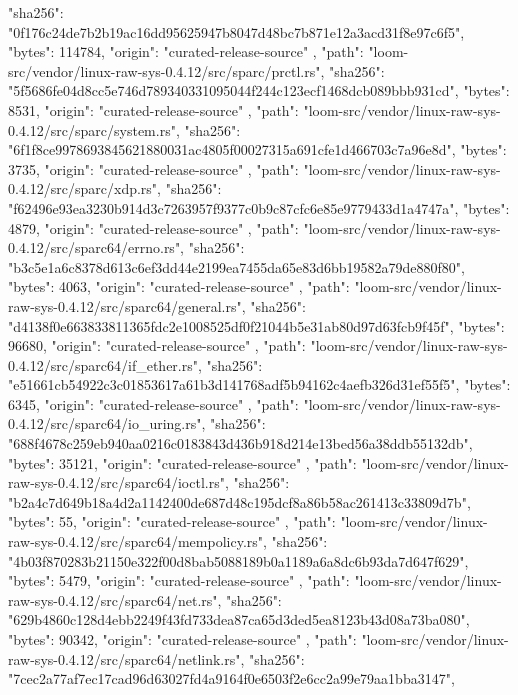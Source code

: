 {{      "sha256": "0f176c24de7b2b19ac16dd95625947b8047d48bc7b871e12a3acd31f8e97c6f5",
      "bytes": 114784,
      "origin": "curated-release-source"
    },
    {
      "path": "loom-src/vendor/linux-raw-sys-0.4.12/src/sparc/prctl.rs",
      "sha256": "5f5686fe04d8cc5e746d789340331095044f244c123ecf1468dcb089bbb931cd",
      "bytes": 8531,
      "origin": "curated-release-source"
    },
    {
      "path": "loom-src/vendor/linux-raw-sys-0.4.12/src/sparc/system.rs",
      "sha256": "6f1f8ce9978693845621880031ac4805f00027315a691cfe1d466703c7a96e8d",
      "bytes": 3735,
      "origin": "curated-release-source"
    },
    {
      "path": "loom-src/vendor/linux-raw-sys-0.4.12/src/sparc/xdp.rs",
      "sha256": "f62496e93ea3230b914d3c7263957f9377c0b9c87cfc6e85e9779433d1a4747a",
      "bytes": 4879,
      "origin": "curated-release-source"
    },
    {
      "path": "loom-src/vendor/linux-raw-sys-0.4.12/src/sparc64/errno.rs",
      "sha256": "b3c5e1a6c8378d613c6ef3dd44e2199ea7455da65e83d6bb19582a79de880f80",
      "bytes": 4063,
      "origin": "curated-release-source"
    },
    {
      "path": "loom-src/vendor/linux-raw-sys-0.4.12/src/sparc64/general.rs",
      "sha256": "d4138f0e663833811365fdc2e1008525df0f21044b5e31ab80d97d63fcb9f45f",
      "bytes": 96680,
      "origin": "curated-release-source"
    },
    {
      "path": "loom-src/vendor/linux-raw-sys-0.4.12/src/sparc64/if_ether.rs",
      "sha256": "e51661cb54922c3c01853617a61b3d141768adf5b94162c4aefb326d31ef55f5",
      "bytes": 6345,
      "origin": "curated-release-source"
    },
    {
      "path": "loom-src/vendor/linux-raw-sys-0.4.12/src/sparc64/io_uring.rs",
      "sha256": "688f4678c259eb940aa0216c0183843d436b918d214e13bed56a38ddb55132db",
      "bytes": 35121,
      "origin": "curated-release-source"
    },
    {
      "path": "loom-src/vendor/linux-raw-sys-0.4.12/src/sparc64/ioctl.rs",
      "sha256": "b2a4c7d649b18a4d2a1142400de687d48c195dcf8a86b58ac261413c33809d7b",
      "bytes": 55,
      "origin": "curated-release-source"
    },
    {
      "path": "loom-src/vendor/linux-raw-sys-0.4.12/src/sparc64/mempolicy.rs",
      "sha256": "4b03f870283b21150e322f00d8bab5088189b0a1189a6a8dc6b93da7d647f629",
      "bytes": 5479,
      "origin": "curated-release-source"
    },
    {
      "path": "loom-src/vendor/linux-raw-sys-0.4.12/src/sparc64/net.rs",
      "sha256": "629b4860c128d4ebb2249f43fd733dea87ca65d3ded5ea8123b43d08a73ba080",
      "bytes": 90342,
      "origin": "curated-release-source"
    },
    {
      "path": "loom-src/vendor/linux-raw-sys-0.4.12/src/sparc64/netlink.rs",
      "sha256": "7cec2a77af7ec17cad96d63027fd4a9164f0e6503f2e6cc2a99e79aa1bba3147",
}}
